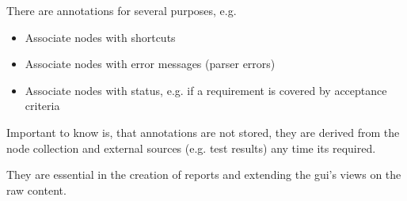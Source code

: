 \documentclass[12pt]{article}
\begin{document}
There are annotations for several purposes, e.g.
\begin{itemize}
 \item Associate nodes with shortcuts
 \item Associate nodes with error messages (parser errors)
 \item Associate nodes with status, e.g. if a requirement is covered by
  acceptance criteria
\end{itemize}

Important to know is, that annotations are not stored, they are derived from the
node collection and external sources (e.g. test results) any time its required.

They are essential in the creation of reports and extending the gui's views on the raw content.
\end{document}
